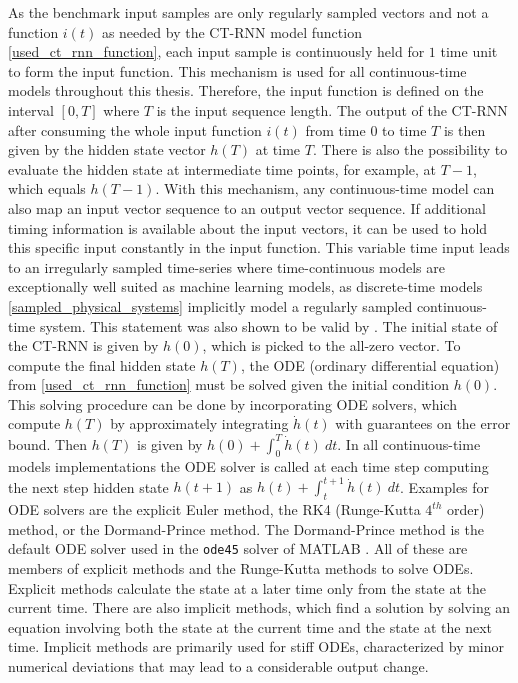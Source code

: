 \documentclass[draft,final]{vutinfth} %
\begin{document}
As the benchmark input samples are only regularly sampled vectors and not a function $i(t)$ as needed by the CT-RNN model function \ref{used_ct_rnn_function}, each input sample is continuously held for $1$ time unit to form the input function.
This mechanism is used for all continuous-time models throughout this thesis.
Therefore, the input function is defined on the interval $[0, T]$ where $T$ is the input sequence length.
The output of the CT-RNN after consuming the whole input function $i(t)$ from time $0$ to time $T$ is then given by the hidden state vector $h(T)$ at time $T$.
There is also the possibility to evaluate the hidden state at intermediate time points, for example, at $T-1$, which equals $h(T-1)$.
With this mechanism, any continuous-time model can also map an input vector sequence to an output vector sequence.
If additional timing information is available about the input vectors, it can be used to hold this specific input constantly in the input function.
This variable time input leads to an irregularly sampled time-series where time-continuous models are exceptionally well suited as machine learning models, as discrete-time models \ref{sampled_physical_systems} implicitly model a regularly sampled continuous-time system.
This statement was also shown to be valid by \cite{ODELSTM}.
The initial state of the CT-RNN is given by $h(0)$, which is picked to the all-zero vector.
To compute the final hidden state $h(T)$, the ODE (ordinary differential equation) from \ref{used_ct_rnn_function} must be solved given the initial condition $h(0)$.
This solving procedure can be done by incorporating ODE solvers, which compute $h(T)$ by approximately integrating $\dot h(t)$ with guarantees on the error bound.
Then $h(T)$ is given by $h(0) + \int_0^T{\dot h(t)}~dt$.
In all continuous-time models implementations the ODE solver is called at each time step computing the next step hidden state $h(t+1)$ as $h(t) + \int_t^{t+1}{\dot h(t)}~dt$.
Examples for ODE solvers are the explicit Euler method, the RK4 (Runge-Kutta $4^{th}$ order) method, or the Dormand-Prince method.
The Dormand-Prince method is the default ODE solver used in the \texttt{ode45} solver of MATLAB \cite{MATLAB}.
All of these are members of explicit methods and the Runge-Kutta methods to solve ODEs. Explicit methods calculate the state at a later time only from the state at the current time.
There are also implicit methods, which find a solution by solving an equation involving both the state at the current time and the state at the next time.
Implicit methods are primarily used for stiff ODEs, characterized by minor numerical deviations that may lead to a considerable output change.
\end{document}
